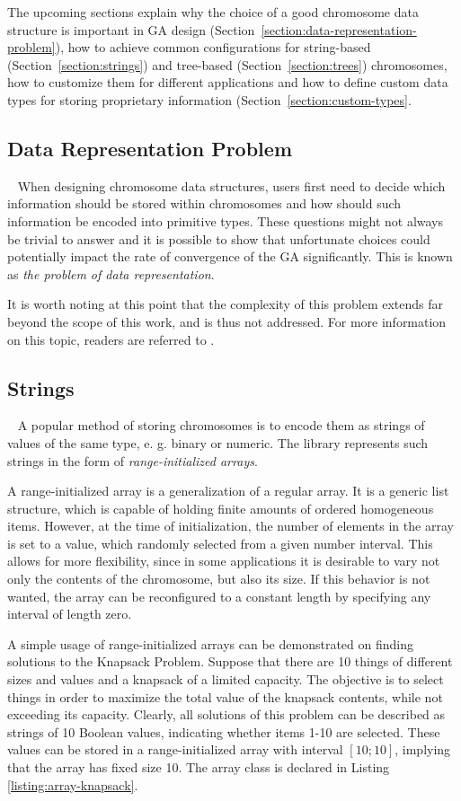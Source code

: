 The upcoming sections explain why the choice of a good chromosome data structure is important in GA design (Section~\ref{section:data-representation-problem}), how to achieve common configurations for string-based (Section~\ref{section:strings}) and tree-based (Section~\ref{section:trees}) chromosomes, how to customize them for different applications and how to define custom data types for storing proprietary information (Section~\ref{section:custom-types}.

\subsection{Data Representation Problem}~\label{section:data-representation-problem}
When designing chromosome data structures, users first need to decide which information should be stored within chromosomes and how should such information be encoded into primitive types. These questions might not always be trivial to answer and it is possible to show that unfortunate choices could potentially impact the rate of convergence of the GA significantly. This is known as \textit{the problem of data representation}.

It is worth noting at this point that the complexity of this problem extends far beyond the scope of this work, and is thus not addressed. For more information on this topic, readers are referred to \cite{GaPracticalHandbook}.

\subsection{Strings}~\label{section:strings}
A popular method of storing chromosomes is to encode them as strings of values of the same type, e. g. binary or numeric. The library represents such strings in the form of \textit{range-initialized arrays}.

A range-initialized array is a generalization of a regular array. It is a generic list structure, which is capable of holding finite amounts of ordered homogeneous items. However, at the time of initialization, the number of elements in the array is set to a value, which randomly selected from a given number interval. This allows for more flexibility, since in some applications it is desirable to vary not only the contents of the chromosome, but also its size. If this behavior is not wanted, the array can be reconfigured to a constant length by specifying any interval of length zero.

A simple usage of range-initialized arrays can be demonstrated on finding solutions to the Knapsack Problem. Suppose that there are 10 things of different sizes and values and a knapsack of a limited capacity. The objective is to select things in order to maximize the total value of the knapsack contents, while not exceeding its capacity. Clearly, all solutions of this problem can be described as strings of 10 Boolean values, indicating whether items 1-10 are selected. These values can be stored in a range-initialized array with interval $[10;10]$, implying that the array has fixed size 10. The array class is declared in Listing \ref{listing:array-knapsack}.

